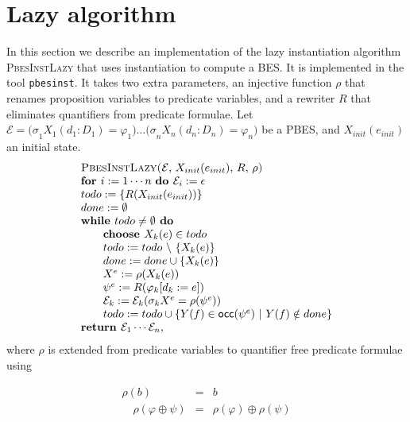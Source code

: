 \documentclass{article}
\newcommand{\Do}{\text{\textbf{ do }}}
\newcommand{\For}{\text{\textbf{for }}}
\newcommand{\While}{\text{\textbf{while }}}
\newcommand{\Choose}{\text{\textbf{choose }}}
\newcommand{\Return}{\text{\textbf{return }}}
\begin{document}
\section{Lazy algorithm}

In this section we describe an implementation of the lazy instantiation
algorithm \textsc{PbesInstLazy} that uses instantiation to compute a BES. It
is implemented in the tool \texttt{pbesinst}. It takes two extra parameters,
an injective function $\rho $ that renames proposition variables to
predicate variables, and a rewriter $R$ that eliminates quantifiers from
predicate formulae. Let $\mathcal{E=(\sigma }_{1}X_{1}(d_{1}:D_{1})=\varphi
_{1})\ldots \mathcal{(\sigma }_{n}X_{n}(d_{n}:D_{n})=\varphi _{n})$ be a
PBES, and $X_{init}(e_{init})$ an initial state.%
\begin{equation*}
\begin{array}{l}
\text{\textsc{PbesInstLazy(}}\mathcal{E}\text{, }X_{init}(e_{init})\text{, }R%
\text{, }\rho \text{\textsc{)}} \\
\For i:=1\cdots n\text{ \textbf{do }}\mathcal{E}%
_{i}:=\epsilon  \\
todo:=\{R(X_{init}(e_{init}))\} \\
done:=\emptyset  \\
\While todo\neq \emptyset \Do \\
\qquad \Choose X_{k}(e)\in todo \\
\qquad todo:=todo\ \backslash \ \{X_{k}(e)\} \\
\qquad done:=done\cup \{X_{k}(e)\} \\
\qquad X^{e}:=\rho (X_{k}(e)) \\
\qquad \psi ^{e}:=R(\varphi _{k}[d_{k}:=e]) \\
\qquad \mathcal{E}_{k}:=\mathcal{E}_{k}(\mathcal{\sigma }_{k}X^{e}=\rho
(\psi ^{e})) \\
\qquad todo:=todo\cup \{Y(f)\in \mathsf{occ}(\psi ^{e})\ |\ Y(f)\notin done\}
\\
\Return \mathcal{E}_{1}\cdots \mathcal{E}_{n},%
\end{array}%
\end{equation*}%
where $\rho $ is extended from predicate variables to quantifier free
predicate formulae using

\begin{eqnarray*}
\rho (b) &=&b \\
\quad \rho (\varphi \oplus \psi ) &=&\rho (\varphi )\oplus \rho (\psi )
\end{eqnarray*}%
\newpage
\end{document}
